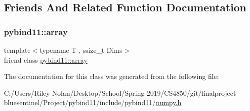 \subsection{Friends And Related Function Documentation}
\mbox{\label{classunchecked__mutable__reference_abcb10178a21ebe8e899ca951b2e68608}} 
\subsubsection{\texorpdfstring{pybind11::array}{pybind11::array}}
{\footnotesize\ttfamily template$<$typename T , ssize\+\_\+t Dims$>$ \\
friend class \mbox{\hyperlink{_s_d_l__opengl__glext_8h_a52f38e7d822a46377fde7a02708eedb1}{pybind11\+::array}}\hspace{0.3cm}{\ttfamily [friend]}}



The documentation for this class was generated from the following file\+:\begin{DoxyCompactItemize}
\item 
C\+:/\+Users/\+Riley Nolan/\+Desktop/\+School/\+Spring 2019/\+C\+S4850/git/finalproject-\/bluesentinel/\+Project/pybind11/include/pybind11/\mbox{\hyperlink{numpy_8h}{numpy.\+h}}\end{DoxyCompactItemize}
